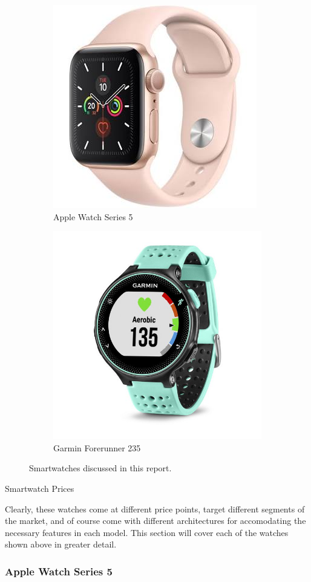 \begin{figure}[h]
    \centering
    \begin{subfigure}{.5\textwidth}
      \centering
      \includegraphics[width=.4\linewidth]{media/apple_pic.jpeg}
      \caption{Apple Watch Series 5 \cite{apple_price}}
      \label{fig:sub1}
    \end{subfigure}%
    \begin{subfigure}{.5\textwidth}
        \centering
        \includegraphics[width=.4\linewidth]{media/garmin_pic.jpeg}
        \caption{Garmin Forerunner 235 \cite{garmin_price}}
        \label{fig:sub3}
      \end{subfigure}
    \caption{Smartwatches discussed in this report.}
    \label{watches:pictures}
\end{figure}

\begin{table}[h]
    \centering
    \caption{Smartwatch Prices}
    \label{watch:price} 
\end{table}

Clearly, these watches come at different price points, target different segments of the market, and
of course come with different architectures for accomodating the necessary features in each model. This
section will cover each of the watches shown above in greater detail.

\subsubsection{Apple Watch Series 5}

